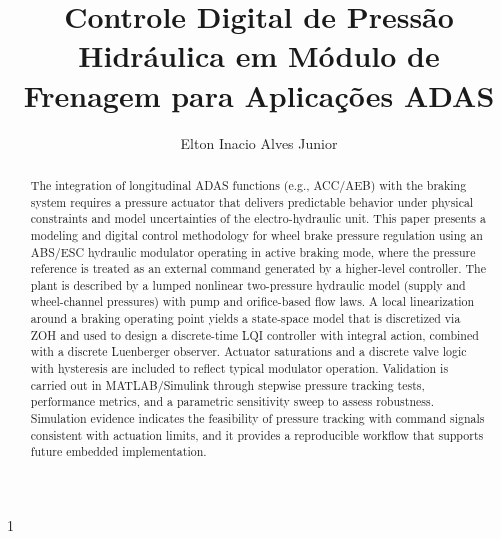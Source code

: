 \documentclass[a4paper]{ifacconf}
\def\portugues{1}
\def\portugues{0}
\begin{document}
\if\portugues1


   \begin{frontmatter}

      \title{Controle Digital de Pressão Hidráulica em Módulo de Frenagem para Aplicações ADAS}



      \author[First]{Elton Inacio Alves Junior}

      \address[First]{Departamento de Engenharia de Sistemas Eletrônicos, Universidade De São Paulo - USP.}


      \renewcommand{\abstractname}{{\bf Abstract:~}}
      \begin{abstract}                %
         The integration of longitudinal ADAS functions (e.g., ACC/AEB) with the braking system requires a pressure actuator that delivers predictable behavior under physical constraints and model uncertainties of the electro-hydraulic unit. This paper presents a modeling and digital control methodology for wheel brake pressure regulation using an ABS/ESC hydraulic modulator operating in active braking mode, where the pressure reference is treated as an external command generated by a higher-level controller. The plant is described by a lumped nonlinear two-pressure hydraulic model (supply and wheel-channel pressures) with pump and orifice-based flow laws. A local linearization around a braking operating point yields a state-space model that is discretized via ZOH and used to design a discrete-time LQI controller with integral action, combined with a discrete Luenberger observer. Actuator saturations and a discrete valve logic with hysteresis are included to reflect typical modulator operation. Validation is carried out in MATLAB/Simulink through stepwise pressure tracking tests, performance metrics, and a parametric sensitivity sweep to assess robustness. Simulation evidence indicates the feasibility of pressure tracking with command signals consistent with actuation limits, and it provides a reproducible workflow that supports future embedded implementation.


\end{abstract}
\end{frontmatter}
\end{document}
